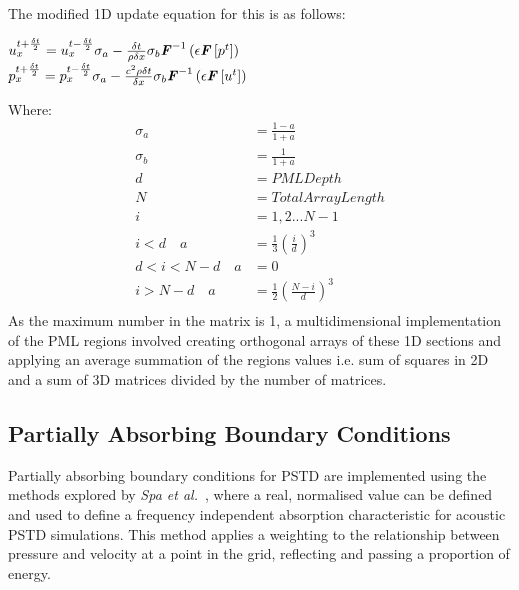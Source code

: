 The modified 1D update equation for this is as follows:\\
\begin{center}
$u^{t + \frac{\delta t}{2}}_{x} = u^{t - \frac{\delta t}{2}}_{x} \sigma_a - \frac{\delta t}{\rho \delta x} \sigma_b \textbf{\textit{F}}^{-1}\left(\epsilon \textbf{\textit{F}}\left[p^{t}\right] \right)$\\
$p^{t + \frac{\delta t}{2}}_{x} = p^{t - \frac{\delta t}{2}}_{x} \sigma_a - \frac{c^2 \rho \delta t}{\delta x} \sigma_b \textbf{\textit{F}}^{-1}\left( \epsilon \textbf{\textit{F}} \left[ u^{t} \right] \right)$\\
\end{center}
Where:\\
\begin{equation}
\begin{aligned}
\sigma_a & = \frac{1-a}{1+a} \\
\sigma_b & = \frac{1}{1 + a} \\
d & = PML Depth\\
N & = Total Array Length \\
i & = 1,2... N-1\\
i < d \quad a & = \frac{1}{3} \left( \frac{i}{d} \right)^3\\
d < i < N - d \quad a & = 0\\
i > N-d \quad a & = \frac{1}{2} \left( \frac{N - i}{d} \right) ^3 \\ 
\end{aligned}
\end{equation}
As the maximum number in the matrix is 1, a multidimensional implementation of the PML regions involved creating orthogonal arrays of these 1D sections and applying an average summation of the regions values i.e. sum of squares in 2D and a sum of 3D matrices divided by the number of matrices.

\subsection{Partially Absorbing Boundary Conditions}
Partially absorbing boundary conditions for PSTD are implemented using the methods explored by \textit{Spa et al.}~\cite{Spa2011}, where a real, normalised value can be defined and used to define a frequency independent absorption characteristic for acoustic PSTD simulations. This method applies a weighting to the relationship between pressure and velocity at a point in the grid, reflecting and passing a proportion of energy.\\

